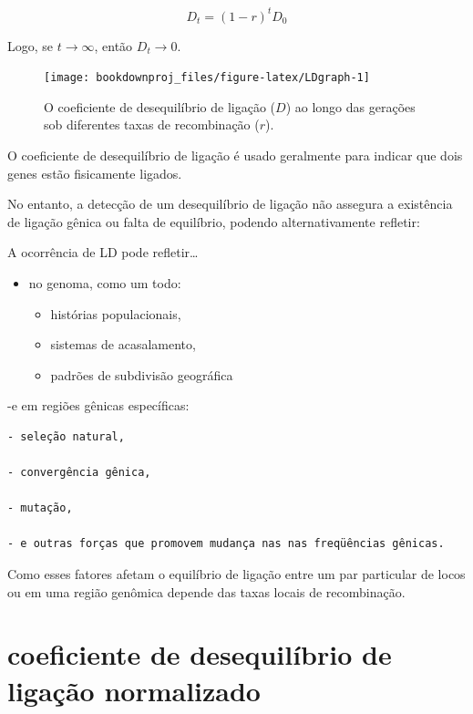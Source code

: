 \documentclass[
]{book}
\begin{document}
\[D_{t} = \left( 1-r \right)^t D_{0}\]

Logo, se \(t → ∞\), então \(D_t → 0\).

\begin{figure}

{\centering \texttt{[image: bookdownproj\_files/figure-latex/LDgraph-1]} 

}

\caption{O coeficiente de desequilíbrio de ligação ($D$) ao longo das gerações sob diferentes taxas de recombinação ($r$).}\label{fig:LDgraph}
\end{figure}

O coeficiente de desequilíbrio de ligação é usado geralmente para indicar que dois genes estão fisicamente ligados.

No entanto, a detecção de um desequilíbrio de ligação não assegura a existência de ligação gênica ou falta de equilíbrio, podendo alternativamente refletir:

A ocorrência de LD pode refletir\ldots{}

\begin{itemize}
\item
  no genoma, como um todo:

  \begin{itemize}
  \item
    histórias populacionais,
  \item
    sistemas de acasalamento,
  \item
    padrões de subdivisão geográfica
  \end{itemize}
\end{itemize}

-e em regiões gênicas específicas:

\begin{verbatim}
- seleção natural, 

- convergência gênica, 

- mutação, 

- e outras forças que promovem mudança nas nas freqüências gênicas.
\end{verbatim}

Como esses fatores afetam o equilíbrio de ligação entre um par particular de locos ou em uma região genômica depende das taxas locais de recombinação.

\hypertarget{coeficiente-de-desequiluxedbrio-de-ligauxe7uxe3o-normalizado}{%
\section{coeficiente de desequilíbrio de ligação normalizado}\label{coeficiente-de-desequiluxedbrio-de-ligauxe7uxe3o-normalizado}}
\end{document}
